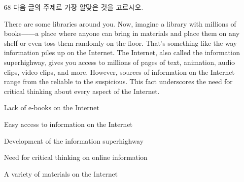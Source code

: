 \begin{question}{68}
다음 글의 주제로 가장 알맞은 것을 고르시오.
\begin{framedtext}
There are some libraries around you. Now, imagine a library with millions of books――a place where anyone can bring in materials and place them on any shelf or even toss them randomly on the floor. That's something like the way information piles up on the Internet. The Internet, also called the information superhighway, gives you access to millions of pages of text, animation, audio clips, video clips, and more. However, sources of information on the Internet range from the reliable to the suspicious. This fact underscores the need for critical thinking about every aspect of the Internet.
\end{framedtext}
\begin{choices}
  \item Lack of e-books on the Internet
  \item Easy access to information on the Internet
  \item Development of the information superhighway
  \item Need for critical thinking on online information
  \item A variety of materials on the Internet
\end{choices}
\end{question}
